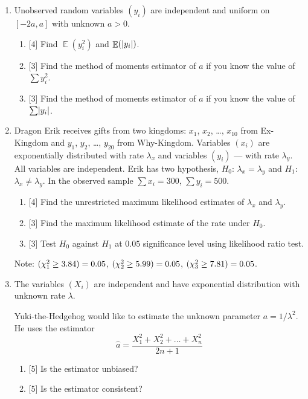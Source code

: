 \documentclass[12pt]{article}
\DeclarePairedDelimiter{\abs}{\lvert}{\rvert}
\let\P\relax
\DeclareMathOperator{\P}{\mathbb{P}}
\DeclareMathOperator{\E}{\mathbb{E}}
\begin{document}
\begin{enumerate}
    \item Unobserved random variables $(y_i)$ are independent and uniform on $[-2a, a]$ with unknown $a > 0$.

    \begin{enumerate}
        \item {[4]} Find $\E(y_i^2)$ and $\E(\abs{y_i})$.
        \item {[3]} Find the method of moments estimator of $a$ if you know the value of $\sum y_i^2$.
        \item {[3]} Find the method of moments estimator of $a$ if you know the value of $\sum \abs{y_i}$.
    \end{enumerate}

    \item Dragon Erik receives gifts from two kingdoms: $x_1$, $x_2$, \dots, $x_{10}$ from Ex-Kingdom and $y_1$, $y_2$, \dots, $y_{20}$ from Why-Kingdom. 
    Variables $(x_i)$ are exponentially distributed with rate $\lambda_x$ and variables $(y_i)$ — with rate $\lambda_y$.
    All variables are independent. 
    Erik has two hypothesis, $H_0$: $\lambda_x = \lambda_y$ and $H_1$: $\lambda_x \neq \lambda_y$.
    In the observed sample $\sum x_i = 300$, $\sum y_i = 500$.
    
    \begin{enumerate}
        \item {[4]} Find the unrestricted maximum likelihood estimates of $\lambda_x$ and $\lambda_y$.
        \item {[3]} Find the maximum likelihood estimate of the rate under $H_0$.
        \item {[3]} Test $H_0$ against $H_1$ at $0.05$ significance level using likelihood ratio test.
    \end{enumerate}

    Note: $\P(\chi^2_1 \geq 3.84) =0.05$, $\P(\chi^2_2 \geq 5.99 ) =0.05$, $\P(\chi^2_3 \geq 7.81) = 0.05$.

    \item The variables $(X_i)$ are independent and have exponential distribution with unknown rate $\lambda$.
    
    Yuki-the-Hedgehog would like to estimate the unknown parameter $a = 1/\lambda^2$.
    He uses the estimator
    \[
        \hat a = \frac{X_1^2 + X_2^2 + \dots + X_n^2}{2n + 1}
    \]

    \begin{enumerate}
        \item {[5]} Is the estimator unbiased?
        \item {[5]} Is the estimator consistent?
    \end{enumerate}


\end{enumerate}
\end{document}
